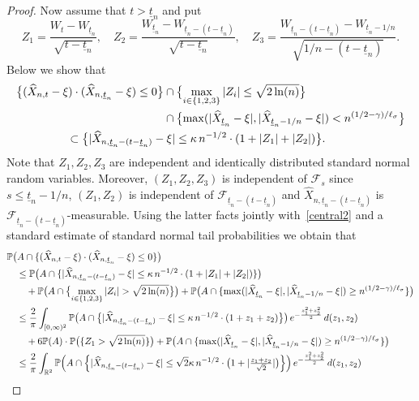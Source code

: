 \documentclass[11pt]{amsart}
\newcommand{\R}{{\mathbb R}}
\newcommand{\PP}{{\mathbb P}}
\newcommand{\utn}{\underline {t}_n}
\newcommand{\F}{{\mathcal F}}
\theoremstyle{plain}
\theoremstyle{definition}
\begin{document}
\begin{proof}
Now assume that $t > \utn$ and put
\[
Z_1 = \frac{W_t-W_{\utn}}{\sqrt{t-\utn}},\quad Z_2 = \frac{W_{\utn}-W_{\utn-(t-\utn)}}{\sqrt{t-\utn}},\quad Z_3=\frac{W_{\utn-(t-\utn)}-W_{\utn-1/n} }{\sqrt{1/n-(t-\utn)}}.
\]
Below we show that
\begin{equation}\label{central2}
\begin{aligned}
\bigl\{(\widehat X_{n,t}-\xi)\cdot (\widehat X_{n,\utn}-\xi)\le 0\bigr\}&\cap \bigl\{\max_{i\in\{1,2,3\}}|Z_i| \le \sqrt{2\ln(n)}\bigr\}\\
&\cap \bigl\{\max(|\widehat X_{\utn}-\xi|,|\widehat X_{\utn-1/n}-\xi|)< n^{(1/2-\gamma)/\ell_\sigma}\bigr\}  \\
& \hspace{-3cm} \subset \bigl\{|\widehat X_{n, \utn-(t-\utn)}-\xi| \le \kappa\, n^{-1/2}\cdot (1+|Z_1|+|Z_2|)\bigr\}.
\end{aligned}
\end{equation}
Note that $Z_1,Z_2,Z_3$ are independent and identically  distributed standard normal random variables. Moreover, $(Z_1,Z_2,Z_3)$ is independent of $\F_s$ since $s \le \utn-1/n$, $(Z_1,Z_2)$ is independent of $\F_{\utn-(t-\utn)}$ and $\widehat X_{n, \utn-(t-\utn)}$ is $\F_{\utn-(t-\utn)}$-measurable. Using the latter facts jointly with~\eqref{central2} and a standard estimate of standard normal tail probabilities we  obtain that
\begin{align*}
& \PP\bigl(A \cap \{(\widehat X_{n,t}-\xi)\cdot ( \widehat X_{n, \utn}-\xi)\le 0\}\bigr)\\
& \quad \le \PP\bigl(A\cap \{|\widehat X_{n, \utn-(t-\utn)}-\xi| \le \kappa\,n^{-1/2}\cdot(1+|Z_1|+|Z_2|)\}\bigr) \\
& \qquad    + \PP\bigl(A\cap \bigl\{\max_{i\in\{1,2,3\}}|Z_i| > \sqrt{2\ln(n)}\bigr\}\bigr) + \PP\bigl(A\cap\{\max(|\widehat X_{\utn}-\xi|,|\widehat X_{\utn-1/n}-\xi|)\geq n^{(1/2-\gamma)/\ell_\sigma}\}\bigr)\\
&  \quad  \le \frac{2}{\pi}\int_{[0,\infty)^2} \PP\bigl(A\cap\bigl\{|\widehat X_{n,\utn-(t-\utn)}-\xi| \le \kappa\,n^{-1/2}\cdot(1+z_1+z_2)\bigr\}\bigr)\,e^{-\frac{z_1^2+z_2^2}{2}}\, d(z_1,z_2)\\
& \qquad   +6\PP(A)\cdot \PP\bigl(\{Z_1 > \sqrt{2\ln(n)}\}\bigr)+ \PP\bigl(A\cap\{\max(|\widehat X_{\utn}-\xi|,|\widehat X_{\utn-1/n}-\xi|)\geq n^{(1/2-\gamma)/\ell_\sigma}\}\bigr)\\
&  \quad  \le \frac{2}{\pi}\int_{\R^2} \PP\Bigl(A\cap\Bigl\{|\widehat X_{n,\utn-(t-\utn)}-\xi| \le \sqrt{2}\kappa\,n^{-1/2} \cdot\bigl(1+|\tfrac{z_1+z_2}{\sqrt{2}}|\bigr)\Bigr\}\Bigr)\, e^{-\frac{z_1^2+z_2^2}{2}}\, d(z_1,z_2)\\

\end{align*}
\end{proof}
\end{document}
